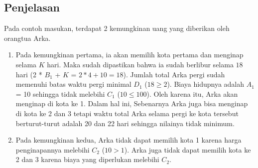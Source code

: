 \documentclass{article}
\begin{document}
\subsection*{Penjelasan}
Pada contoh masukan, terdapat 2 kemungkinan uang yang diberikan oleh orangtua Arka.

\begin{enumerate}
    \item Pada kemungkinan pertama, ia akan memilih kota pertama dan menginap selama $K$ hari. Maka sudah dipastikan bahwa ia sudah berlibur selama $18$ hari (2 * $B_1$ + $K$ = $2*4+10=18$). Jumlah total Arka pergi sudah memenuhi batas waktu pergi minimal $D_1$ ($18\geq2$). Biaya hidupnya adalah $A_1$ = 10 sehingga tidak melebihi $C_1$ ($10\leq100$). Oleh karena itu, Arka akan menginap di kota ke 1. Dalam hal ini, Sebenarnya Arka juga bisa menginap di kota ke 2 dan 3 tetapi waktu total Arka selama pergi ke kota tersebut berturut-turut adalah 20 dan 22 hari sehingga nilainya tidak minimum.
    \item Pada kemungkinan kedua, Arka tidak dapat memilih kota 1 karena harga penginapannya melebihi $C_2$ ($10>1$). Arka juga tidak dapat memilih kota ke 2 dan 3 karena biaya yang diperlukan melebihi $C_2$.
\end{enumerate}
\end{document}
